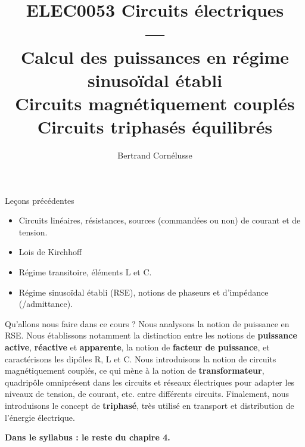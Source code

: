 

\title{\textbf{} ELEC0053 Circuits électriques \\[2mm] --- \\[2mm] 
	Calcul des puissances en régime sinusoïdal établi\\ Circuits magnétiquement couplés\\  
	Circuits triphasés équilibrés}
\author{Bertrand Corn\'elusse}

\usepackage{mathtools}
\usepackage{url}
%

\newcommand{\mymotor}[2] %
{\draw[thick,rotate=#2] (#1) circle (10pt)
	node[]{$\mathsf M$} 
	++(-12pt,3pt)--++(0,-6pt) --++(2.5pt,0) ++(-2.8pt,6pt)-- ++(2.5pt,0pt);
	\draw[thick,rotate=#2] (#1) ++(12pt,3pt)--++(0,-6pt) --++(-2.5pt,0) ++(2.8pt,6pt)-- ++(-2.5pt,0pt);
}

\newcommand{\mymotorB}[1] %
{\draw[thick] (#1) circle (12pt)
	node[above=-3pt]{$\mathsf M$} ++(-8pt,-3pt)--++(15pt,0);
	\draw[thick,dashed] (#1) ++(-8pt,-5pt)--++(15pt,0);
}


\begin{frame}
  \titlepage
\end{frame}


\begin{frame} {Leçons précédentes}
\begin{itemize}
	\item Circuits linéaires, résistances, sources (commandées ou non) de courant et de tension.
	\item Lois de Kirchhoff
	\item Régime transitoire, éléments L et C.
	\item Régime sinusoïdal établi (RSE), notions de phaseurs et d'impédance (/admittance).
\end{itemize}
\vfill
\end{frame}

\begin{frame}{Qu'allons nous faire dans ce cours ?}
Nous analysons la notion de puissance en RSE. Nous établissons notamment la distinction entre les notions de \textbf{puissance active}, \textbf{réactive} et \textbf{apparente}, la notion de \textbf{facteur de puissance}, et caractérisons les dipôles R, L et C.
\vfill 
Nous introduisons la notion de circuits magnétiquement couplés, ce qui mène à la notion de \textbf{transformateur}, quadripôle omniprésent dans les circuits et réseaux électriques pour adapter les niveaux de tension, de courant, etc. entre différents circuits.
\vfill 	
Finalement, nous introduisons le concept de \textbf{triphasé}, très utilisé en transport et distribution de l'énergie électrique.
\vfill 

\textbf{Dans le syllabus : le reste du chapire 4.}
\end{frame}

